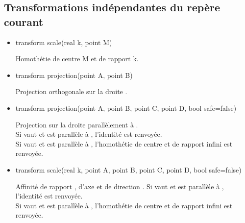 \documentclass[pdftex]{article}
\begin{document}
\subsection{Transformations indépendantes du repère courant}
\begin{itemize}
\item {}
  \begin{Vcolor}
    transform scale(real k, point M)
  \end{Vcolor}
  Homothétie de centre M et de rapport k.


\item {}
  \begin{Vcolor}
    transform projection(point A, point B)
  \end{Vcolor}
  Projection orthogonale sur la droite .

\item {}
  \begin{Vcolor}
    transform projection(point A, point B, point C, point D, bool safe=false)
  \end{Vcolor}
  Projection sur la droite  parallèlement à .\\
  Si  vaut  et  est parallèle
  à , l'identité est renvoyée.\\
  Si  vaut  et  est parallèle à , l'homothétie de
  centre  et de rapport infini est renvoyée.\\

\item {}
  \begin{Vcolor}
    transform scale(real k, point A, point B, point C, point D, bool safe=false)
  \end{Vcolor}
  Affinité de rapport , d'axe  et de direction .
  Si  vaut  et  est parallèle à , l'identité est renvoyée.\\
  Si  vaut  et  est parallèle à , l'homothétie de
  centre  et de rapport infini est renvoyée.\\

\end{itemize}
\end{document}
